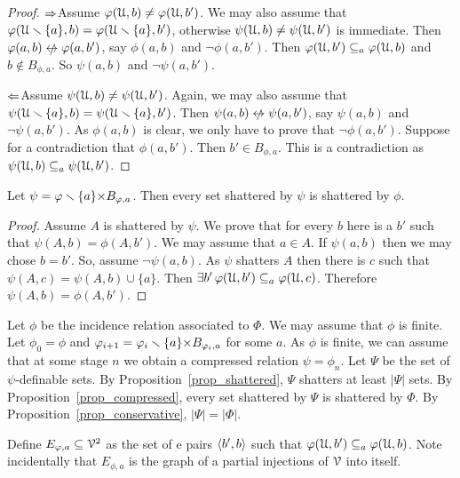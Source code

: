 \documentclass[sputnik.tex]{subfiles}
\begin{document}
\begin{proof}
$\Rightarrow$\quad Assume $\varphi(\EuScript U,b)\neq\varphi(\EuScript U,b')$.
We may also assume that $\varphi(\EuScript U\smallsetminus\{a\},b)=\varphi(\EuScript U\smallsetminus\{a\},b')$, otherwise $\psi(\EuScript U,b)\neq\psi(\EuScript U,b')$ is immediate.
Then $\phi(a,b)\niff\phi(a,b')$, say $ \phi(a,b)$ and $\neg \phi(a,b')$.
Then $\varphi(\EuScript U,b')\subseteq_a\varphi(\EuScript U,b)$ and $b\notin B_{\phi,a}$.
So $\psi(a,b)$ and $\neg \psi(a,b')$.

$\Leftarrow$\quad Assume $\psi(\EuScript U,b)\neq\psi(\EuScript U,b')$. 
Again, we may also assume that $\psi(\EuScript U\smallsetminus\{a\},b)=\psi(\EuScript U\smallsetminus\{a\},b')$.
Then $\psi(a,b)\niff\psi(a,b')$, say $\psi(a,b)$ and $\neg\psi(a,b')$.
As $\phi(a,b)$ is clear, we only have to prove that $\neg\phi(a,b')$.
Suppose for a contradiction that $\phi(a,b')$.
Then $b'\in B_{\phi,a}$.
This is a contradiction as $\psi(\EuScript U,b)\subseteq_a\psi(\EuScript U,b')$.
\end{proof}


\begin{proposition}\label{prop_shattered} 
Let $\psi=\varphi\smallsetminus\{a\}{\times}B_{\varphi,a}$.
Then every set shattered by $\psi$ is shattered by $\phi$.
\end{proposition}

\begin{proof}
Assume $A$ is shattered by $\psi$.
We prove that for every $b$ here is a $b'$ such that $\psi(A,b)=\phi(A,b')$.
We may assume that $a\in A$.
If $\psi(a,b)$ then we may chose $b=b'$.
So, assume $\neg\psi(a,b)$.
As $\psi$ shatters $A$ then there is $c$ such that $\psi(A,c)=\psi(A,b)\cup\{a\}$.
Then $\exists b'\,\varphi(\EuScript U,b')\subseteq_a\varphi(\EuScript U,c)$.
Therefore $\psi(A,b)=\phi(A,b')$.
\end{proof}


\begin{void_thm}\label{proof2_Pajor}\rm
Let $\phi$ be the incidence relation associated to $\Phi$.
We may assume that $\phi$ is finite.
Let $\phi_0=\phi$ and $\varphi_{i+1}=\varphi_i\smallsetminus \{a\}{\times}B_{\varphi_i,a}$ for some $a$.
As $\phi$ is finite, we can assume that at some stage $n$ we obtain a compressed relation $\psi=\phi_n$.
Let $\Psi$ be the set of $\psi$-definable sets.
By Proposition~\ref{prop_shattered}, $\Psi$ shatters at least $|\Psi|$ sets.
By Proposition~\ref{prop_compressed}, every set shattered by $\Psi$ is shattered by $\Phi$.
By Proposition~\ref{prop_conservative}, $|\Psi|=|\Phi|$.\QED
\end{void_thm}

Define $E_{\varphi,a}\subseteq\EuScript V^2$ as the set of e pairs $\langle b',b\rangle$ such that $\varphi(\EuScript U,b')\subseteq_a\varphi(\EuScript U,b)$. 
Note incidentally that $E_{\phi,a}$ is the graph of a partial injections of $\EuScript V$ into itself. 
\end{document}
